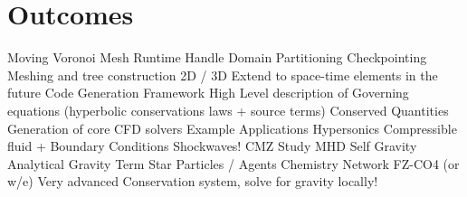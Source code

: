 \documentclass{article}
\begin{document}
\section{Outcomes}
\begin{outline}
  \1 Moving Voronoi Mesh Runtime \2 Handle Domain Partitioning
  \2 Checkpointing
  \2 Meshing and tree construction
  \2 2D / 3D
  \2 Extend to space-time elements in the future
  \1 Code Generation Framework
  \2 High Level description of 
  \3 Governing equations (hyperbolic conservations laws + source terms)
  \3 Conserved Quantities
  \2 Generation of core CFD solvers
  \1 Example Applications
  \2 Hypersonics 
  \3 Compressible fluid + Boundary Conditions
  \3 Shockwaves!
  \2 CMZ Study
  \3 MHD
  \3 Self Gravity
  \3 Analytical Gravity Term
  \3 Star Particles / Agents
  \3 Chemistry Network
  \2 FZ-CO4 (or w/e)
  \3 Very advanced Conservation system, solve for gravity locally!
\end{outline}

\printbibliography
\end{document}
